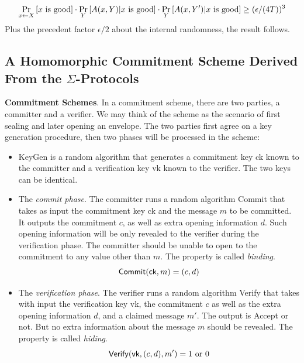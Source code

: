 \documentclass{article}
\begin{document}
\begin{itemize}
\begin{equation*}
\mathop{\operatorname{Pr}}_{x \leftarrow X} \left[ x \text{ is good} \right] \cdot \mathop{\operatorname{Pr}}_Y \left[ A(x, Y) \vert x \text{ is good} \right] \cdot \mathop{\operatorname{Pr}}_Y \left[ A(x, Y') \vert x \text{ is good} \right] \geq (\epsilon/(4T))^3
\end{equation*}
Plus the precedent factor $\epsilon/2$ about the internal randomness, the result follows. 
\end{itemize}

\subsection{A Homomorphic Commitment Scheme Derived From the $\Sigma$-Protocols}

\textbf{Commitment Schemes}. In a commitment scheme, there are two parties, a committer and a verifier. We may think of the scheme as the scenario of first sealing and later opening an envelope. The two parties first agree on a key generation procedure, then two phases will be processed in the scheme: 
\begin{itemize}
\item \textsf{KeyGen} is a random algorithm that generates a commitment key \textsf{ck} known to the committer and a verification key \textsf{vk} known to the verifier. The two keys can be identical.
\item The \textit{commit phase}. The committer runs a random algorithm \textsf{Commit} that takes as input the commitment key \textsf{ck} and the message $m$ to be committed. It outputs the commitment $c$, as well as extra opening information $d$. Such opening information will be only revealed to the verifier during the verification phase. The committer should be unable to open to the commitment to any value other than $m$. The property is called \textit{binding}. 
\begin{equation*}
\text{\textsf{Commit}}(\text{\textsf{ck}}, m) = (c, d)
\end{equation*}
\item The \textit{verification phase}. The verifier runs a random algorithm \textsf{Verify} that takes with input the verification key \textsf{vk}, the commitment $c$ as well as the extra opening information $d$, and a claimed message $m'$. The output is \textsf{Accept} or not. But no extra information about the message $m$ should be revealed. The property is called \textit{hiding}. 
\begin{equation*}
\text{\textsf{Verify}}(\text{\textsf{vk}}, (c, d), m') = 1 \text{ or } 0
\end{equation*}
\end{itemize} 
\end{document}
